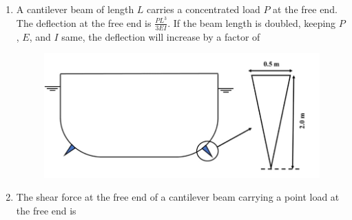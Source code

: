\documentclass[journal,12pt,onecolumn]{IEEEtran}
\theoremstyle{remark}
\begin{document}
\begin{enumerate}
\begin{enumerate}[label=\Alph*.]
\end{enumerate}

\item A cantilever beam of length $L$ carries a concentrated load $P$ at the free end.  
The deflection at the free end is $\frac{PL^3}{3EI}$.  
If the beam length is doubled, keeping $P$, $E$, and $I$ same, the deflection will increase by a factor of\hfill{}

\begin{figure}[H]
    \centering
    \includegraphics[scale=0.35]{figs/q38.jpg}
    \caption{}
    \label{fig:figure1}
\end{figure}

\begin{enumerate}[label=\Alph*.]
\end{enumerate}

\item The shear force at the free end of a cantilever beam carrying a point load at the free end is\hfill{}

\begin{enumerate}[label=\Alph*.]
\end{enumerate}


\end{enumerate}
\end{document}
